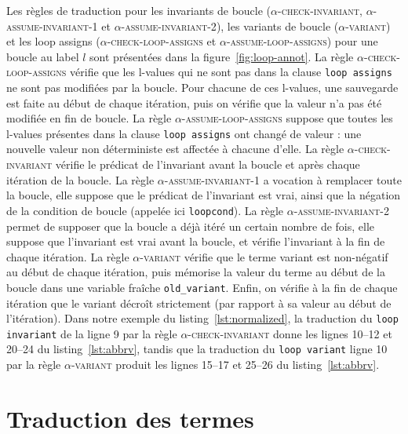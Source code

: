 Les règles de traduction pour les invariants de boucle
(\textsc{$\alpha$-check-invariant}, \textsc{$\alpha$-assume-invariant-1} et
\textsc{$\alpha$-assume-invariant-2}), les variants de boucle
(\textsc{$\alpha$-variant}) et les loop assigns
(\textsc{$\alpha$-check-loop-assigns} et \textsc{$\alpha$-assume-loop-assigns})
pour une boucle au label $l$ sont présentées dans la
figure~\ref{fig:loop-annot}.
La règle \textsc{$\alpha$-check-loop-assigns} vérifie que les l-values qui ne
sont pas dans la clause \lstinline'loop assigns' ne sont pas modifiées par la
boucle. Pour chacune de ces l-values, une sauvegarde est faite au début de
chaque itération, puis on vérifie que la valeur n'a pas été modifiée en fin de
boucle.
La règle \textsc{$\alpha$-assume-loop-assigns} suppose que toutes les l-values
présentes dans la clause \lstinline'loop assigns' ont changé de valeur : une
nouvelle valeur non déterministe est affectée à chacune d'elle.
La règle \textsc{$\alpha$-check-invariant} vérifie le prédicat de l'invariant
avant la boucle et après chaque itération de la boucle.
La règle \textsc{$\alpha$-assume-invariant-1} a vocation à remplacer toute la
boucle, elle suppose que le prédicat de l'invariant est vrai, ainsi que la
négation de la condition de boucle (appelée ici \lstinline'loopcond').
La règle \textsc{$\alpha$-assume-invariant-2} permet de supposer que la boucle
a déjà itéré un certain nombre de fois, elle suppose que l'invariant est vrai
avant la boucle, et vérifie l'invariant à la fin de chaque itération.
La règle \textsc{$\alpha$-variant} vérifie que le terme variant est non-négatif
au début de chaque itération, puis mémorise la valeur du terme au début de la
boucle dans une variable fraîche \lstinline|old_variant|. Enfin, on vérifie à la
fin de chaque itération que le variant décroît strictement (par rapport à sa
valeur au début de l'itération).
Dans notre exemple du listing~\ref{lst:normalized}, la traduction du
\lstinline'loop invariant' de la ligne 9 par la règle
\textsc{$\alpha$-check-invariant} donne les lignes 10--12 et 20--24 du
listing~\ref{lst:abbrv}, tandis que la traduction du \lstinline'loop variant'
ligne 10 par la règle \textsc{$\alpha$-variant} produit les lignes 15--17 et
25--26 du listing~\ref{lst:abbrv}.




\section{Traduction des termes \eacsl}
\label{sec:term}

